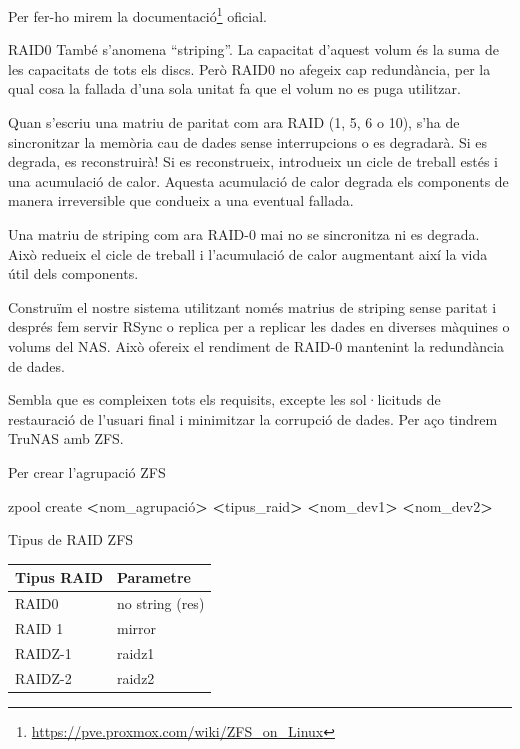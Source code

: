 \documentclass[
  10pt,
]{krantz}
\newenvironment{Shaded}{\begin{snugshade}}{\end{snugshade}}
\newcommand{\ExtensionTok}[1]{#1}
\newcommand{\NormalTok}[1]{#1}
\newcommand{\OperatorTok}[1]{\textcolor[rgb]{0.81,0.36,0.00}{\textbf{#1}}}
\DeclareRobustCommand{\href}[2]{#2\footnote{\url{#1}}}
\begin{document}
Per fer-ho mirem la \href{https://pve.proxmox.com/wiki/ZFS_on_Linux}{documentació} oficial.

RAID0 També s'anomena ``striping''. La capacitat d'aquest volum és la suma de les capacitats de tots els discs. Però RAID0 no afegeix cap redundància, per la qual cosa la fallada d'una sola unitat fa que el volum no es puga utilitzar.

Quan s'escriu una matriu de paritat com ara RAID (1, 5, 6 o 10), s'ha de sincronitzar la memòria cau de dades sense interrupcions o es degradarà. Si es degrada, es reconstruirà! Si es reconstrueix, introdueix un cicle de treball estés i una acumulació de calor. Aquesta acumulació de calor degrada els components de manera irreversible que condueix a una eventual fallada.

Una matriu de striping com ara RAID-0 mai no se sincronitza ni es degrada. Això redueix el cicle de treball i l'acumulació de calor augmentant així la vida útil dels components.

Construïm el nostre sistema utilitzant només matrius de striping sense paritat i després fem servir RSync o replica per a replicar les dades en diverses màquines o volums del NAS. Això ofereix el rendiment de RAID-0 mantenint la redundància de dades.

Sembla que es compleixen tots els requisits, excepte les sol·licituds de restauració de l'usuari final i minimitzar la corrupció de dades. Per aço tindrem TruNAS amb ZFS.

Per crear l'agrupació ZFS

\begin{Shaded}
\begin{Highlighting}[]
\ExtensionTok{zpool}\NormalTok{ create }\OperatorTok{\textless{}}\NormalTok{nom\_agrupació}\OperatorTok{\textgreater{}} \OperatorTok{\textless{}}\NormalTok{tipus\_raid}\OperatorTok{\textgreater{}} \OperatorTok{\textless{}}\NormalTok{nom\_dev1}\OperatorTok{\textgreater{}} \OperatorTok{\textless{}}\NormalTok{nom\_dev2}\OperatorTok{\textgreater{}}
\end{Highlighting}
\end{Shaded}

Tipus de RAID ZFS

\begin{longtable}[]{@{}ll@{}}
\toprule
Tipus RAID & Parametre \\
\midrule
\endhead
RAID0 & no string (res) \\
RAID 1 & mirror \\
RAIDZ-1 & raidz1 \\
RAIDZ-2 & raidz2 \\
\bottomrule
\end{longtable}
\end{document}

